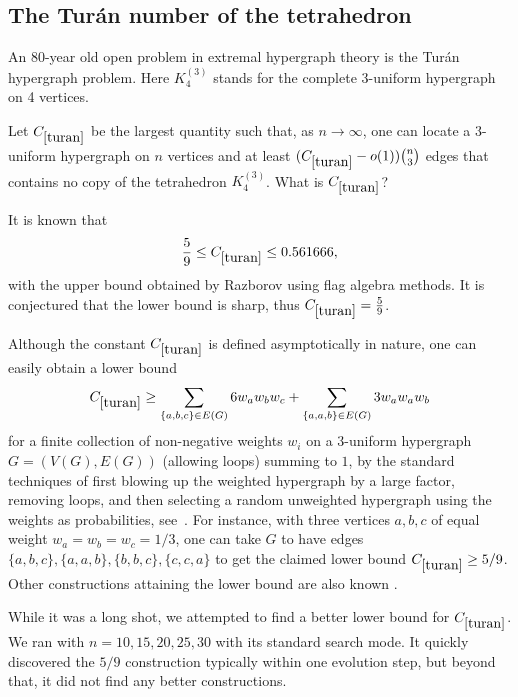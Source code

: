 \subsection{The Tur\'an number of the tetrahedron} 

An 80-year old open problem in extremal hypergraph theory is the Tur\'an hypergraph problem. Here $K_4^{(3)}$ stands for the complete 3-uniform hypergraph on 4 vertices.

\renewcommand{\problemURL}{https://google-deepmind.github.io/alphaevolve_repository_of_problems/problems/37.html}

\begin{problem}\label{turan}  Let $C_{\ref{turan}}$ be the largest quantity such that, as $n \to \infty$, one can locate a $3$-uniform hypergraph on $n$ vertices and at least $(C_{\ref{turan}}-o(1)) \binom{n}{3}$ edges that contains no copy of the tetrahedron $K^{(3)}_4$.  What is $C_{\ref{turan}}$?
\end{problem}

It is known that 
$$ \frac{5}{9} \leq C_{\ref{turan}} \leq 0.561666,$$
with the upper bound obtained by Razborov \cite{razborov} using flag algebra methods. It is conjectured that the lower bound is sharp, thus $C_{\ref{turan}} = \frac{5}{9}$.

Although the constant $C_{\ref{turan}}$ is defined asymptotically in nature, one can easily obtain a lower bound
$$ C_{\ref{turan}} \geq \sum_{\{a,b,c\} \in E(G)} 6 w_a w_b w_c + \sum_{\{a,a,b\} \in E(G)} 3 w_a w_a w_b$$
for a finite collection of non-negative weights $w_i$ on a $3$-uniform hypergraph $G = (V(G), E(G))$ (allowing loops) summing to $1$, by the standard techniques of first blowing up the weighted hypergraph by a large factor, removing loops, and then selecting a random unweighted hypergraph using the weights as probabilities, see~\cite{keevash2011hypergraph}.  For instance, with three vertices $a,b,c$ of equal weight $w_a=w_b=w_c=1/3$, one can take $G$ to have edges $\{a,b,c\}, \{a,a,b\}, \{b,b,c\}, \{c,c,a\}$ to get the claimed lower bound $C_{\ref{turan}} \geq 5/9$.  
Other constructions attaining the lower bound are also known \cite{kostochka}.


While it was a long shot, we attempted to find a better lower bound for $C_{\ref{turan}}$. We ran \AlphaEvolve with $n=10, 15, 20, 25, 30$ with its standard search mode. It quickly discovered the $5/9$ construction typically within one evolution step, but beyond that, it did not find any better constructions.

